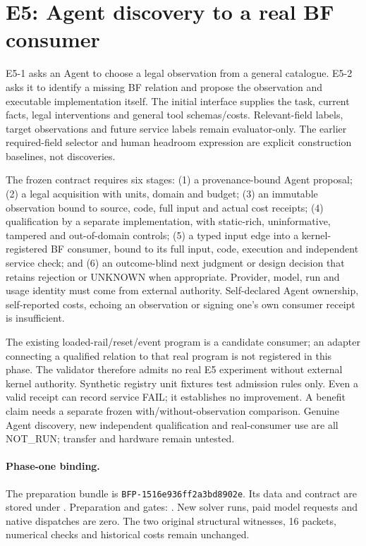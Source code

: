 \section{E5: Agent discovery to a real BF consumer}
E5-1 asks an Agent to choose a legal observation from a general catalogue.
E5-2 asks it to identify a missing BF relation and propose the observation and
executable implementation itself. The initial interface supplies the task,
current facts, legal interventions and general tool schemas/costs. Relevant-field
labels, target observations and future service labels remain evaluator-only.
The earlier required-field selector and human headroom expression are explicit
construction baselines, not discoveries.

The frozen contract requires six stages: (1) a provenance-bound Agent proposal;
(2) a legal acquisition with units, domain and budget; (3) an immutable observation
bound to source, code, full input and actual cost receipts; (4) qualification by
a separate implementation, with static-rich, uninformative, tampered and
out-of-domain controls; (5) a typed input edge into a kernel-registered BF
consumer, bound to its full input, code, execution and independent service check;
and (6) an outcome-blind next judgment or design decision that retains rejection
or UNKNOWN when appropriate. Provider, model, run and usage identity must come
from external authority. Self-declared Agent ownership, self-reported costs,
echoing an observation or signing one's own consumer receipt is insufficient.

The existing loaded-rail/reset/event program is a candidate consumer; an adapter
connecting a qualified relation to that real program is not registered in this
phase. The validator therefore admits no real E5 experiment without external
kernel authority. Synthetic registry unit fixtures test admission rules only.
Even a valid receipt can record service FAIL; it establishes no improvement.
A benefit claim needs a separate frozen with/without-observation comparison.
Genuine Agent discovery, new independent qualification and real-consumer use
are all NOT\_RUN; transfer and hardware remain untested.

\paragraph{Phase-one binding.}
The preparation bundle is \texttt{BFP-1516e936ff2a3bd8902e}.
Its data and contract are stored under
. Preparation and gates:
. New solver runs, paid model requests
and native dispatches are zero. The two original structural witnesses,
16 packets, numerical checks and historical costs remain unchanged.
